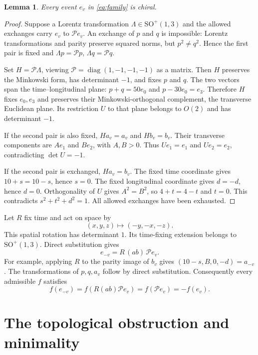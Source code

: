 \documentclass[11pt,a4paper]{article}
\newtheorem{lemma}[theorem]{Lemma}
\newcommand{\SO}{\mathrm{SO}^{+}(1,3)}
\newcommand{\PP}{\mathcal P}
\begin{document}
\begin{lemma}\label{lem:chiral}
Every event $e_v$ in \eqref{eq:family} is chiral.
\end{lemma}
\begin{proof}
Suppose a Lorentz transformation $\Lambda\in\SO$ and the allowed
exchanges carry $e_v$ to $\PP e_v$. An exchange of $p$ and $q$ is
impossible: Lorentz transformations and parity preserve squared norms,
but $p^2\ne q^2$. Hence the first pair is fixed and
$\Lambda p=\PP p$, $\Lambda q=\PP q$.

Set $H=\PP\Lambda$, viewing $\PP=\operatorname{diag}(1,-1,-1,-1)$
as a matrix. Then $H$ preserves the Minkowski form, has determinant
$-1$, and fixes $p$ and $q$. The two vectors span the time--longitudinal
plane: $p+q=50e_0$ and $p-30e_0=e_3$. Therefore $H$ fixes $e_0,e_3$
and preserves their Minkowski-orthogonal complement, the transverse
Euclidean plane. Its restriction $U$ to that plane belongs to $O(2)$
and has determinant $-1$.

If the second pair is also fixed, $H a_v=a_v$ and $H b_v=b_v$.
Their transverse components are $A e_1$ and $B e_2$, with $A,B>0$.
Thus $U e_1=e_1$ and $U e_2=e_2$, contradicting $\det U=-1$.

If the second pair is exchanged, $H a_v=b_v$. The fixed time
coordinate gives $10+s=10-s$, hence $s=0$. The fixed longitudinal
coordinate gives $d=-d$, hence $d=0$. Orthogonality of $U$ gives
$A^2=B^2$, so $4+t=4-t$ and $t=0$. This contradicts
$s^2+t^2+d^2=1$. All allowed exchanges have been exhausted.
\end{proof}

Let $R$ fix time and act on space by
\[
 (x,y,z)\longmapsto(-y,-x,-z).
\]
This spatial rotation has determinant $1$. Its time-fixing extension
belongs to $\SO$. Direct substitution gives
\begin{equation}\label{eq:antipodal}
 e_{-v}= R\,(ab)\,\PP e_v.
\end{equation}
For example, applying $R$ to the parity image of $b_v$ gives
$(10-s,B,0,-d)=a_{-v}$. The transformations of $p,q,a_v$ follow by
direct substitution. Consequently every admissible $f$ satisfies
\begin{equation}\label{eq:odd}
 f(e_{-v})=f(R(ab)\PP e_v)=f(\PP e_v)=-f(e_v).
\end{equation}

\section{The topological obstruction and minimality}
\end{document}
